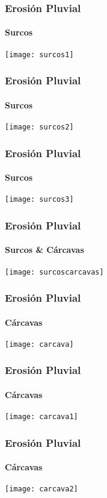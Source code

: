 \documentclass{beamer}
\begin{document}
\begin{frame}
\frametitle{Erosión Pluvial}
\framesubtitle{Surcos}
\begin{center}
\texttt{[image: surcos1]}
\end{center}
\end{frame}
\begin{frame}
\frametitle{Erosión Pluvial}
\framesubtitle{Surcos}
\begin{center}
\texttt{[image: surcos2]}
\end{center}
\end{frame}
\begin{frame}
\frametitle{Erosión Pluvial}
\framesubtitle{Surcos}
\begin{center}
\texttt{[image: surcos3]}
\end{center}
\end{frame}
\begin{frame}
\frametitle{Erosión Pluvial}
\framesubtitle{Surcos \& Cárcavas}
\begin{center}
\texttt{[image: surcoscarcavas]}
\end{center}
\end{frame}
\begin{frame}
\frametitle{Erosión Pluvial}
\framesubtitle{Cárcavas}
\begin{center}
\texttt{[image: carcava]}
\end{center}
\end{frame}
\begin{frame}
\frametitle{Erosión Pluvial}
\framesubtitle{Cárcavas}
\begin{center}
\texttt{[image: carcava1]}
\end{center}
\end{frame}
\begin{frame}
\frametitle{Erosión Pluvial}
\framesubtitle{Cárcavas}
\begin{center}
\texttt{[image: carcava2]}
\end{center}
\end{frame}
\end{document}
